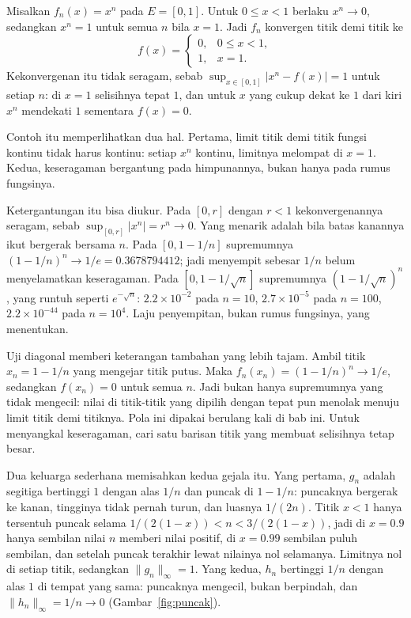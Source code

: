 \begin{contoh}
Misalkan $f_n(x)=x^n$ pada $E=[0,1]$. Untuk $0\le x<1$ berlaku $x^n\to0$,
sedangkan $x^n=1$ untuk semua $n$ bila $x=1$. Jadi $f_n$ konvergen titik demi
titik ke
\[
  f(x)=\begin{cases}0, & 0\le x<1,\\ 1, & x=1.\end{cases}
\]
Kekonvergenan itu tidak seragam, sebab $\sup_{x\in[0,1]}|x^n-f(x)|=1$ untuk
setiap $n$: di $x=1$ selisihnya tepat $1$, dan untuk $x$ yang cukup dekat ke $1$
dari kiri $x^n$ mendekati $1$ sementara $f(x)=0$.
\end{contoh}

Contoh itu memperlihatkan dua hal. Pertama, limit titik demi titik fungsi kontinu
tidak harus kontinu: setiap $x^n$ kontinu, limitnya melompat di $x=1$. Kedua,
keseragaman bergantung pada himpunannya, bukan hanya pada rumus fungsinya.

Ketergantungan itu bisa diukur. Pada $[0,r]$ dengan $r<1$ kekonvergenannya
seragam, sebab $\sup_{[0,r]}|x^n|=r^n\to0$. Yang menarik adalah bila batas
kanannya ikut bergerak bersama $n$. Pada $[0,1-1/n]$ supremumnya
$(1-1/n)^n\to1/e=0.3678794412$; jadi menyempit sebesar $1/n$ belum
menyelamatkan keseragaman. Pada $[0,1-1/\sqrt{n}]$ supremumnya
$(1-1/\sqrt n)^n$, yang runtuh seperti $e^{-\sqrt n}$: $2.2\times10^{-2}$ pada
$n=10$, $2.7\times10^{-5}$ pada $n=100$, $2.2\times10^{-44}$ pada $n=10^4$. Laju
penyempitan, bukan rumus fungsinya, yang menentukan.

Uji diagonal memberi keterangan tambahan yang lebih tajam. Ambil titik
$x_n=1-1/n$ yang mengejar titik putus. Maka $f_n(x_n)=(1-1/n)^n\to1/e$,
sedangkan $f(x_n)=0$ untuk semua $n$. Jadi bukan hanya supremumnya yang tidak
mengecil: nilai di titik-titik yang dipilih dengan tepat pun menolak menuju
limit titik demi titiknya. Pola ini dipakai berulang kali di bab ini. Untuk
menyangkal keseragaman, cari satu barisan titik yang membuat selisihnya tetap
besar.

Dua keluarga sederhana memisahkan kedua gejala itu. Yang pertama, $g_n$ adalah
segitiga bertinggi $1$ dengan alas $1/n$ dan puncak di $1-1/n$: puncaknya
bergerak ke kanan, tingginya tidak pernah turun, dan luasnya $1/(2n)$. Titik
$x<1$ hanya tersentuh puncak selama $1/(2(1-x))<n<3/(2(1-x))$, jadi di $x=0.9$
hanya sembilan nilai $n$ memberi nilai positif, di $x=0.99$ sembilan puluh
sembilan, dan setelah puncak terakhir lewat nilainya nol selamanya. Limitnya nol
di setiap titik, sedangkan $\|g_n\|_\infty=1$. Yang kedua, $h_n$ bertinggi $1/n$
dengan alas $1$ di tempat yang sama: puncaknya mengecil, bukan berpindah, dan
$\|h_n\|_\infty=1/n\to0$ (Gambar~\ref{fig:puncak}).

